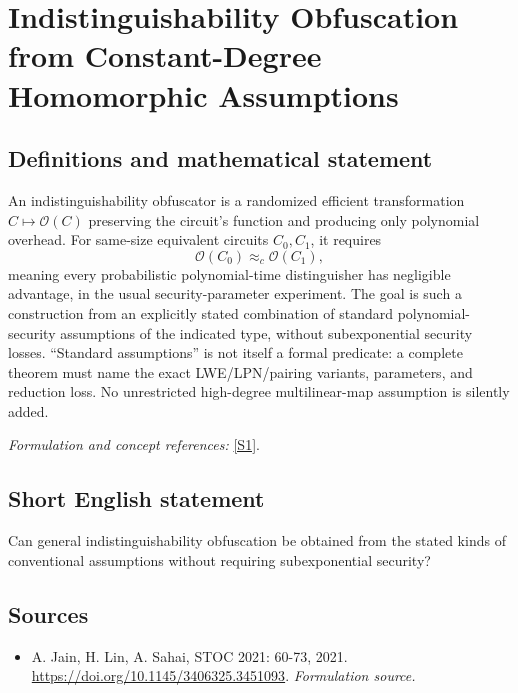\documentclass[11pt]{article}
\begin{document}
\section*{\texorpdfstring{Indistinguishability Obfuscation from Constant-Degree Homomorphic Assumptions}{Indistinguishability Obfuscation from Constant-Degree Homomorphic Assumptions}}\label{statement}
\subsection{Definitions and mathematical statement}
An indistinguishability obfuscator is a randomized efficient transformation $C\mapsto\mathcal O(C)$ preserving the circuit's function and producing only polynomial overhead. For same-size equivalent circuits $C_0,C_1$, it requires
\[
 \mathcal O(C_0)\approx_c\mathcal O(C_1),
\]
meaning every probabilistic polynomial-time distinguisher has negligible advantage, in the usual security-parameter experiment. The goal is such a construction from an explicitly stated combination of standard polynomial-security assumptions of the indicated type, without subexponential security losses. ``Standard assumptions'' is not itself a formal predicate: a complete theorem must name the exact LWE/LPN/pairing variants, parameters, and reduction loss. No unrestricted high-degree multilinear-map assumption is silently added.
\par\smallskip\textit{Formulation and concept references:} \href{https://doi.org/10.1145/3406325.3451093}{[S1]}.

\subsection{Short English statement}
Can general indistinguishability obfuscation be obtained from the stated kinds of conventional assumptions without requiring subexponential security?
\subsection{Sources}
\begin{itemize}
\item[S1]A. Jain, H. Lin, A. Sahai, STOC 2021: 60-73, 2021.
\url{https://doi.org/10.1145/3406325.3451093}.
\textit{Formulation source.}
\end{itemize}
\end{document}
